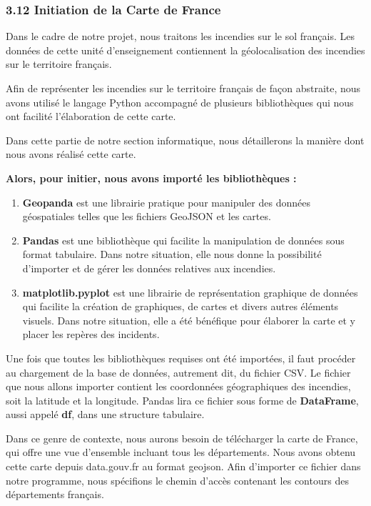 \documentclass[
]{article}
\begin{document}
\subsubsection{3.12 Initiation de la Carte de
France}\label{initiation-de-la-carte-de-france}

Dans le cadre de notre projet, nous traitons les incendies sur le sol
français. Les données de cette unité d'enseignement contiennent la
géolocalisation des incendies sur le territoire français.

Afin de représenter les incendies sur le territoire français de façon
abstraite, nous avons utilisé le langage Python accompagné de plusieurs
bibliothèques qui nous ont facilité l'élaboration de cette carte.

Dans cette partie de notre section informatique, nous détaillerons la
manière dont nous avons réalisé cette carte.

\textbf{Alors, pour initier, nous avons importé les bibliothèques :}

\begin{enumerate}
\def\labelenumi{\arabic{enumi}.}
\item
  \textbf{Geopanda} est une librairie pratique pour manipuler des
  données géospatiales telles que les fichiers GeoJSON et les cartes.
\item
  \textbf{Pandas} est une bibliothèque qui facilite la manipulation de
  données sous format tabulaire. Dans notre situation, elle nous donne
  la possibilité d'importer et de gérer les données relatives aux
  incendies.
\item
  \textbf{matplotlib.pyplot} est une librairie de représentation
  graphique de données qui facilite la création de graphiques, de cartes
  et divers autres éléments visuels. Dans notre situation, elle a été
  bénéfique pour élaborer la carte et y placer les repères des
  incidents.
\end{enumerate}

Une fois que toutes les bibliothèques requises ont été importées, il
faut procéder au chargement de la base de données, autrement dit, du
fichier CSV. Le fichier que nous allons importer contient les
coordonnées géographiques des incendies, soit la latitude et la
longitude. Pandas lira ce fichier sous forme de \textbf{DataFrame},
aussi appelé \textbf{df}, dans une structure tabulaire.

Dans ce genre de contexte, nous aurons besoin de télécharger la carte de
France, qui offre une vue d'ensemble incluant tous les départements.
Nous avons obtenu cette carte depuis data.gouv.fr au format geojson.
Afin d'importer ce fichier dans notre programme, nous spécifions le
chemin d'accès contenant les contours des départements français.
\end{document}
